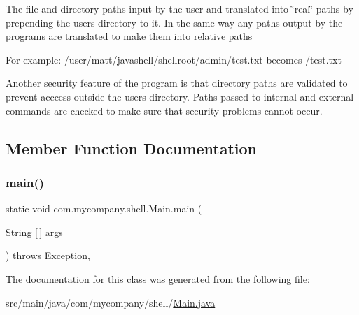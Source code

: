 The file and directory paths input by the user and translated into \char`\"{}real\char`\"{} paths by prepending the user\textquotesingle{}s directory to it. In the same way any paths output by the programs are translated to make them into relative paths

For example\+:  /user/matt/javashell/shellroot/admin/test.txt becomes  /test.txt

Another security feature of the program is that directory paths are validated to prevent acccess outside the user\textquotesingle{}s directory. Paths passed to internal and external commands are checked to make sure that security problems cannot occur. 

\subsection{Member Function Documentation}
\mbox{\label{classcom_1_1mycompany_1_1shell_1_1Main_af1528af6ecb9ddfad09364f6ee6fa706}} 
\subsubsection{\texorpdfstring{main()}{main()}}
{\footnotesize\ttfamily static void com.\+mycompany.\+shell.\+Main.\+main (\begin{DoxyParamCaption}\item[{String \mbox{[}$\,$\mbox{]}}]{args }\end{DoxyParamCaption}) throws Exception\hspace{0.3cm}{\ttfamily [inline]}, {\ttfamily [static]}}



The documentation for this class was generated from the following file\+:\begin{DoxyCompactItemize}
\item 
src/main/java/com/mycompany/shell/\hyperlink{Main_8java}{Main.\+java}\end{DoxyCompactItemize}

